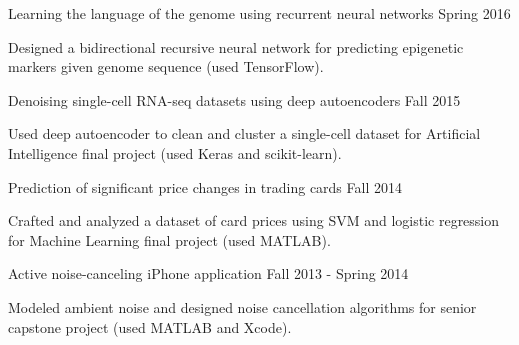 \begin{cventries}
  \cventryproj
    {Learning the language of the genome using recurrent neural networks} %
    {Spring 2016} %
    {
      \begin{cvitems} %
        \item {Designed a bidirectional recursive neural network for predicting epigenetic markers given genome sequence (used TensorFlow).}
      \end{cvitems}
    }
  \cventryproj
    {Denoising single-cell RNA-seq datasets using deep autoencoders} %
    {Fall 2015} %
    {
      \begin{cvitems} %
        \item {Used deep autoencoder to clean and cluster a single-cell dataset for Artificial Intelligence final project (used Keras and scikit-learn).}
      \end{cvitems}
    }
  \cventryproj
    {Prediction of significant price changes in trading cards} %
    {Fall 2014} %
    {
      \begin{cvitems} %
        \item {Crafted and analyzed a dataset of card prices using SVM and logistic regression for Machine Learning final project (used MATLAB).}
      \end{cvitems}
    }
  \cventryproj
    {Active noise-canceling iPhone application} %
    {Fall 2013 -  Spring 2014} %
    {
      \begin{cvitems} %
        \item {Modeled ambient noise and designed noise cancellation algorithms for senior capstone project (used MATLAB and Xcode).}
      \end{cvitems}
    }
\end{cventries}

